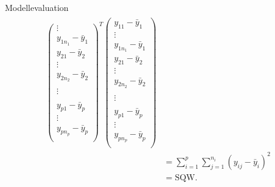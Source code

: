 \documentclass[
  8pt,
  ignorenonframetext,
]{beamer}
\begin{document}
\begin{frame}{Modellevaluation}
\begin{align*}
\begin{split}
\begin{pmatrix}
\vdots                  \\
y_{1n_1} - \bar{y}_1    \\
y_{21}   - \bar{y}_2    \\
\vdots                  \\
y_{2n_2} - \bar{y}_2    \\
                        \\
\vdots                  \\
                        \\
y_{p1}   - \bar{y}_p    \\
\vdots          \\
y_{pn_p} - \bar{y}_p    \\
\end{pmatrix}^T
\begin{pmatrix}
y_{11}   - \bar{y}_1    \\
\vdots                  \\
y_{1n_1} - \bar{y}_1    \\
y_{21}   - \bar{y}_2    \\
\vdots                  \\
y_{2n_2} - \bar{y}_2    \\
                        \\
\vdots                  \\
                        \\
y_{p1}   - \bar{y}_p    \\
\vdots          \\
y_{pn_p} - \bar{y}_p    \\
\end{pmatrix}
\\
& = \sum_{i=1}^p \sum_{j = 1}^{n_i} (y_{ij} - \bar{y}_i)^2 \\
& = \mbox{SQW}.
\end{split}
\end{align*}
\end{frame}
\end{document}
